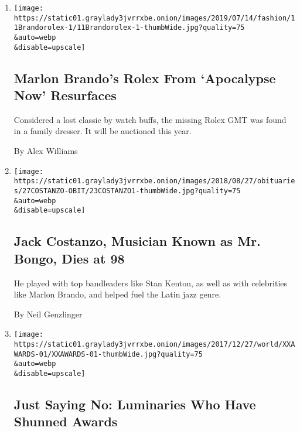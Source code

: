 \begin{enumerate}
\def\labelenumi{\arabic{enumi}.}
\item
  \href{/2019/07/11/style/marlon-brando-rolex-auction-apocalypse-now.html}{}

  \texttt{[image: https://static01.graylady3jvrrxbe.onion/images/2019/07/14/fashion/11Brandorolex-1/11Brandorolex-1-thumbWide.jpg?quality=75\\\&auto=webp\\\&disable=upscale]}

  \hypertarget{marlon-brandos-rolex-from-apocalypse-now-resurfaces}{%
  \subsection{Marlon Brando's Rolex From `Apocalypse Now'
  Resurfaces}\label{marlon-brandos-rolex-from-apocalypse-now-resurfaces}}

  Considered a lost classic by watch buffs, the missing Rolex GMT was
  found in a family dresser. It will be auctioned this year.

  By Alex Williams
\item
  \href{/2018/08/26/obituaries/jack-costanzo-musician-known-as-mr-bongo-dies-at-98.html}{}

  \texttt{[image: https://static01.graylady3jvrrxbe.onion/images/2018/08/27/obituaries/27COSTANZO-OBIT/23COSTANZO1-thumbWide.jpg?quality=75\\\&auto=webp\\\&disable=upscale]}

  \hypertarget{jack-costanzo-musician-known-as-mr-bongo-dies-at-98}{%
  \subsection{Jack Costanzo, Musician Known as Mr. Bongo, Dies at
  98}\label{jack-costanzo-musician-known-as-mr-bongo-dies-at-98}}

  He played with top bandleaders like Stan Kenton, as well as with
  celebrities like Marlon Brando, and helped fuel the Latin jazz genre.

  By Neil Genzlinger
\item
  \href{/2017/12/27/world/europe/awards-refusals.html}{}

  \texttt{[image: https://static01.graylady3jvrrxbe.onion/images/2017/12/27/world/XXAWARDS-01/XXAWARDS-01-thumbWide.jpg?quality=75\\\&auto=webp\\\&disable=upscale]}

  \hypertarget{just-saying-no-luminaries-who-have-shunned-awards}{%
  \subsection{Just Saying No: Luminaries Who Have Shunned
  Awards}\label{just-saying-no-luminaries-who-have-shunned-awards}}


\end{enumerate}
